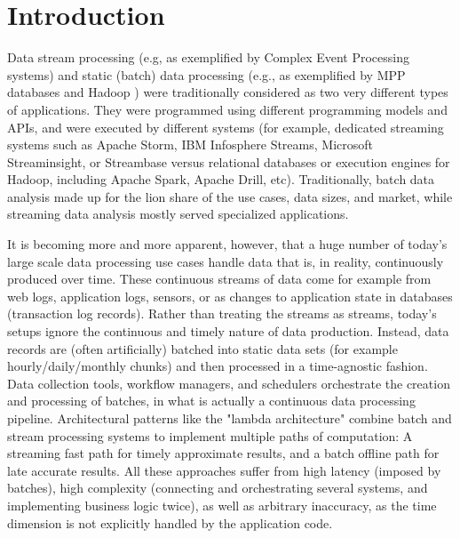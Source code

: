 

\section{Introduction}
\label{sec:intro}
Data stream processing (e.g, as exemplified by Complex Event Processing systems) and static (batch) data processing (e.g., as exemplified by MPP databases and Hadoop ) were traditionally considered as two very different types of applications. They were programmed using different programming models and APIs, and were executed by different systems (for example, dedicated streaming systems such as  Apache Storm, IBM Infosphere Streams, Microsoft Streaminsight, or Streambase versus relational databases or execution engines for Hadoop, including Apache Spark, Apache Drill, etc). Traditionally, batch data analysis made up for the lion share of the use cases, data sizes, and market, while streaming data analysis mostly served specialized applications.

It is becoming more and more apparent, however, that a huge number of today's large scale data processing use cases handle data that is, in reality, continuously produced over time. These continuous streams of data come for example from web logs, application logs, sensors, or as changes to application state in databases (transaction log records). Rather than treating the streams as streams, today's setups ignore the continuous and timely nature of data production. Instead, data records are (often artificially) batched into static data sets (for example hourly/daily/monthly chunks) and then processed in a time-agnostic fashion. Data collection tools, workflow managers, and schedulers orchestrate the creation and processing of batches, in what is actually a continuous data processing pipeline. Architectural patterns like the "lambda architecture" \cite{marz2015big} combine batch and stream processing systems to implement multiple paths of computation: A streaming fast path for timely approximate results, and a batch offline path for late accurate results. All these approaches suffer from high latency (imposed by batches), high complexity (connecting and orchestrating several systems, and implementing business logic twice), as well as arbitrary inaccuracy, as the time dimension is not explicitly handled by the application code.

